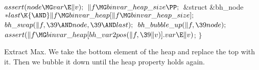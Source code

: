${}\\{assert}(\\{node}\MG\\{var}\E\|v);{}$\6
${}\|f\MG\\{binvar\_heap\_size}\PP;{}$\7
\&{struct} \&{bh\_node} ${}{*}\\{last}\K{\AND}\|f\MG\\{binvar\_heap}[\|f\MG%
\\{binvar\_heap\_size}];{}$\7
${}\\{bh\_swap}(\|f,\39{\AND}\\{node},\39{\AND}\\{last});{}$\6
${}\\{bh\_bubble\_up}(\|f,\39\\{node});{}$\6
${}\\{assert}(\|f\MG\\{binvar\_heap}[\\{bh\_var2pos}(\|f,\39\|v)].\\{var}\E%
\|v){}$;\6
\4${}\}{}$\2\par
\fi

Extract Max. We take the bottom element of the heap and replace the top
with
it. Then we bubble it down until the heap property holds again.

